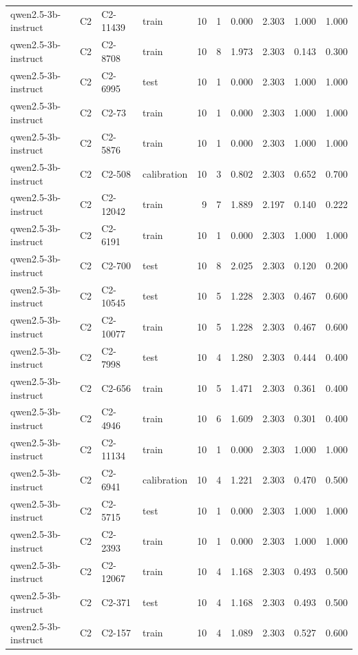 \begin{table}
\begin{tabular}{llllrrrrrr}
qwen2.5-3b-instruct & C2 & C2-11439 & train & 10 & 1 & 0.000 & 2.303 & 1.000 & 1.000 \\
qwen2.5-3b-instruct & C2 & C2-8708 & train & 10 & 8 & 1.973 & 2.303 & 0.143 & 0.300 \\
qwen2.5-3b-instruct & C2 & C2-6995 & test & 10 & 1 & 0.000 & 2.303 & 1.000 & 1.000 \\
qwen2.5-3b-instruct & C2 & C2-73 & train & 10 & 1 & 0.000 & 2.303 & 1.000 & 1.000 \\
qwen2.5-3b-instruct & C2 & C2-5876 & train & 10 & 1 & 0.000 & 2.303 & 1.000 & 1.000 \\
qwen2.5-3b-instruct & C2 & C2-508 & calibration & 10 & 3 & 0.802 & 2.303 & 0.652 & 0.700 \\
qwen2.5-3b-instruct & C2 & C2-12042 & train & 9 & 7 & 1.889 & 2.197 & 0.140 & 0.222 \\
qwen2.5-3b-instruct & C2 & C2-6191 & train & 10 & 1 & 0.000 & 2.303 & 1.000 & 1.000 \\
qwen2.5-3b-instruct & C2 & C2-700 & test & 10 & 8 & 2.025 & 2.303 & 0.120 & 0.200 \\
qwen2.5-3b-instruct & C2 & C2-10545 & test & 10 & 5 & 1.228 & 2.303 & 0.467 & 0.600 \\
qwen2.5-3b-instruct & C2 & C2-10077 & train & 10 & 5 & 1.228 & 2.303 & 0.467 & 0.600 \\
qwen2.5-3b-instruct & C2 & C2-7998 & test & 10 & 4 & 1.280 & 2.303 & 0.444 & 0.400 \\
qwen2.5-3b-instruct & C2 & C2-656 & train & 10 & 5 & 1.471 & 2.303 & 0.361 & 0.400 \\
qwen2.5-3b-instruct & C2 & C2-4946 & train & 10 & 6 & 1.609 & 2.303 & 0.301 & 0.400 \\
qwen2.5-3b-instruct & C2 & C2-11134 & train & 10 & 1 & 0.000 & 2.303 & 1.000 & 1.000 \\
qwen2.5-3b-instruct & C2 & C2-6941 & calibration & 10 & 4 & 1.221 & 2.303 & 0.470 & 0.500 \\
qwen2.5-3b-instruct & C2 & C2-5715 & test & 10 & 1 & 0.000 & 2.303 & 1.000 & 1.000 \\
qwen2.5-3b-instruct & C2 & C2-2393 & train & 10 & 1 & 0.000 & 2.303 & 1.000 & 1.000 \\
qwen2.5-3b-instruct & C2 & C2-12067 & train & 10 & 4 & 1.168 & 2.303 & 0.493 & 0.500 \\
qwen2.5-3b-instruct & C2 & C2-371 & test & 10 & 4 & 1.168 & 2.303 & 0.493 & 0.500 \\
qwen2.5-3b-instruct & C2 & C2-157 & train & 10 & 4 & 1.089 & 2.303 & 0.527 & 0.600 \\

\end{tabular}
\end{table}
